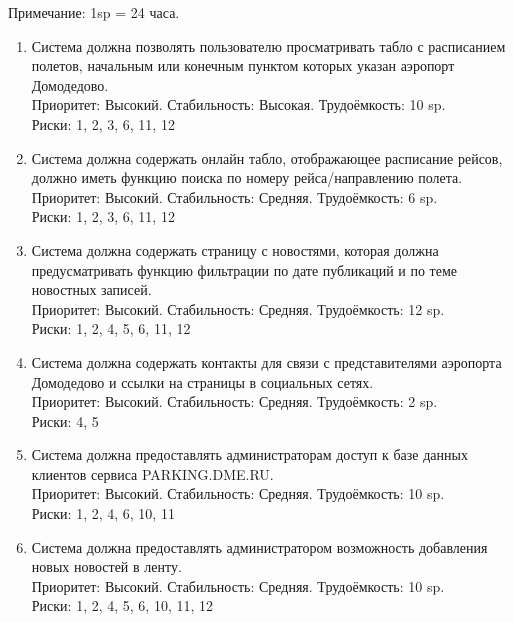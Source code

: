 Примечание: 1sp = 24 часа.
\begin{enumerate}
      \item Система должна позволять пользователю просматривать
            табло с расписанием полетов, начальным или конечным
            пунктом которых указан аэропорт Домодедово. \\
            Приоритет: Высокий. Стабильность: Высокая. Трудоёмкость: 10 sp.\\
            Риски: 1, 2, 3, 6, 11, 12

      \item Система должна содержать онлайн табло, отображающее расписание рейсов,
            должно иметь функцию поиска по номеру рейса/направлению полета. \\
            Приоритет: Высокий. Стабильность: Средняя. Трудоёмкость: 6 sp.\\
            Риски: 1, 2, 3, 6, 11, 12

      \item Система должна содержать страницу с новостями, которая должна
            предусматривать функцию фильтрации по дате публикаций и по
            теме новостных записей. \\
            Приоритет: Высокий. Стабильность: Средняя. Трудоёмкость: 12 sp.\\
            Риски: 1, 2, 4, 5, 6, 11, 12

      \item Система должна содержать контакты для связи с
            представителями аэропорта Домодедово и ссылки
            на страницы в социальных сетях. \\
            Приоритет: Высокий. Стабильность: Средняя. Трудоёмкость: 2 sp.\\
            Риски: 4, 5

      \item Система должна предоставлять администраторам
            доступ к базе данных клиентов сервиса
            PARKING.DME.RU. \\
            Приоритет: Высокий. Стабильность: Средняя. Трудоёмкость: 10 sp.\\
            Риски: 1, 2, 4, 6, 10, 11

      \item Система должна предоставлять администратором возможность
            добавления новых новостей в ленту. \\
            Приоритет: Высокий. Стабильность: Средняя. Трудоёмкость: 10 sp.\\
            Риски: 1, 2, 4, 5, 6, 10, 11, 12


\end{enumerate}
